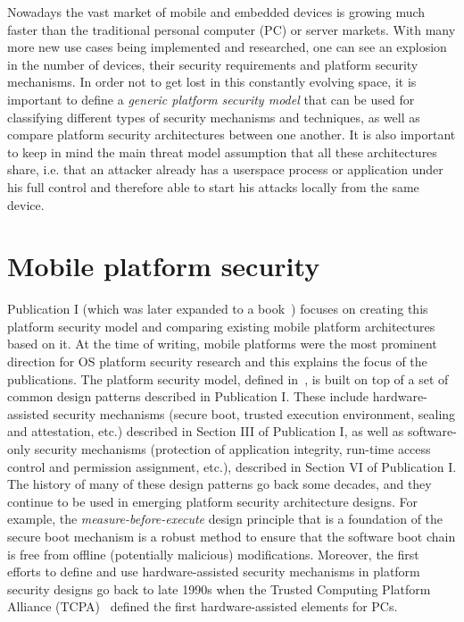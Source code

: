 
Nowadays the vast market of mobile and embedded devices is growing much faster than the traditional personal computer (PC) or server markets. With many more new use cases being implemented and researched, one can see an explosion in the number of devices, their security requirements and platform security mechanisms. In order not to get lost in this constantly evolving space, it is important to define a \textit{generic platform security model} that can be used for classifying different types of security mechanisms and techniques, as well as compare platform security architectures between one another. It is also important to keep in mind the main threat model assumption that all these architectures share, i.e. that an attacker already has a userspace process or application under his full control and therefore able to start his attacks locally from the same device. 

\section{Mobile platform security}

Publication I (which was later expanded to a book~\cite{2013Asokan}) focuses on creating this platform security model and comparing existing mobile platform architectures based on it. At the time of writing, mobile platforms were the most prominent direction for OS platform security research and this explains the focus of the publications. The platform security model, defined in~\cite{2013Asokan}, is built on top of a set of common design patterns described in Publication I. These include hardware-assisted security mechanisms (secure boot, trusted execution environment, sealing and attestation, etc.) described in Section III of Publication I, as well as software-only security mechanisms (protection of application integrity, run-time access control and permission assignment, etc.), described in Section VI of Publication I. The history of many of these design patterns go back some decades, and they continue to be used in emerging platform security architecture designs. For example, the \textit{measure-before-execute} design principle that is a foundation of the secure boot mechanism is a robust method to ensure that the software boot chain is free from offline (potentially malicious) modifications. Moreover, the first efforts to define and use hardware-assisted security mechanisms in platform security designs go back to late 1990s when the Trusted Computing Platform Alliance (TCPA)~\cite{pearson2002} defined the first hardware-assisted elements for PCs.

